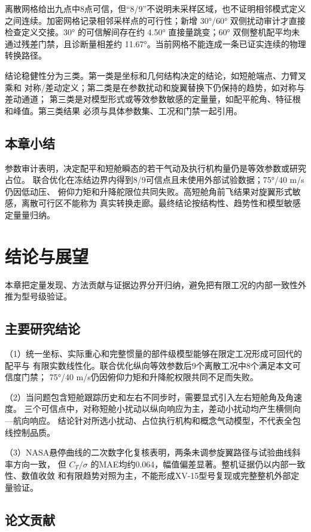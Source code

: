 \documentclass[UTF8,12pt,oneside,openany,fontset=windows]{ctexbook}
\begin{document}
离散网格给出九点中8点可信，但“8/9”不说明未采样区域，也不证明相邻模式定义之间连续。加密网格记录相邻采样点的可行性；新增 30°/60° 双侧扰动审计才直接检查定义交接。30° 的可信解间存在约 4.50° 直接量跳变；60° 双侧整机配平均未通过残差门禁，且诊断量相差约 11.67°。当前网格不能连成一条已证实连续的物理转换路径。

结论稳健性分为三类。第一类是坐标和几何结构决定的结论，如短舱端点、力臂叉乘和 对称/差动定义；第二类是在参数扰动和旋翼替换下仍保持的趋势，如对称与差动通道； 第三类是对模型形式或等效参数敏感的定量量，如配平舵角、特征根和峰值。第三类结果 必须与具体参数集、工况和门禁一起引用。

\section{本章小结}

参数审计表明，决定配平和短舱瞬态的若干气动及执行机构量仍是等效参数或研究占位。 联合优化在冻结边界内得到8/9可信点且未使用外部试验数据；75°/40 m/s仍因低动压、 俯仰力矩和升降舵限位共同失败。高短舱角前飞结果对旋翼形式敏感，离散可行区不能称为 真实转换走廊。最终结论按结构性、趋势性和模型敏感定量量归纳。

\chapter{结论与展望}

本章把定量发现、方法贡献与证据边界分开归纳，避免把有限工况的内部一致性外推为型号级验证。

\section{主要研究结论}

（1）统一坐标、实际重心和完整惯量的部件级模型能够在限定工况形成可回代的配平与 有限实数线性化。联合优化纵向等效参数后9个离散工况中8个满足本文可信度门禁； 75°/40 m/s仍因俯仰力矩和升降舵权限共同不足而失败。

（2）当问题包含短舱跟踪历史和左右不同步时，需要显式引入左右短舱角及角速度。 三个可信点中，对称短舱小扰动以纵向响应为主，差动小扰动均产生横侧向—航向响应。 结论针对所选小扰动、占位执行机构和概念气动模型，不代表全包线控制品质。

（3）NASA悬停曲线的二次数字化复核表明，两条未调参旋翼路径与试验曲线斜率方向一致， 但 \(C_T/\sigma\) 的MAE均约0.064，幅值偏差显著。整机证据仍以内部一致性、数值收敛 和有限趋势对照为主，不能形成XV-15型号复现或完整整机外部定量验证。

\section{论文贡献}
\end{document}
